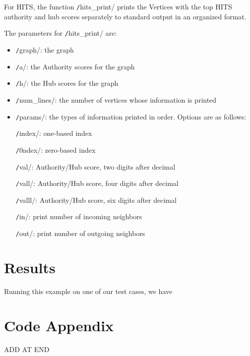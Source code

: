 \documentclass[12pt, titlepage, twoside]{amsart}
\begin{document}
For HITS, the function \texttt/hits_print/ prints
the Vertices with the top HITS authority and hub scores separately to standard output in
an organized format.

The parameters for \texttt/hits_print/ are:

\begin{itemize}[label={}]
\item \texttt/graph/: the graph

\item \texttt/a/: the Authority scores for the graph

\item \texttt/h/: the Hub scores for the graph

\item \texttt/num_lines/: the number of vertices whose information is printed

\item \texttt/params/: the types of information printed in order. Options are as follows:

\texttt/index/: one-based index

\texttt/0ndex/: zero-based index

\texttt/val/: Authority/Hub score, two digits after decimal

\texttt/vall/: Authority/Hub score, four digits after decimal

\texttt/valll/: Authority/Hub score, six digits after decimal

\texttt/in/: print number of incoming neighbors

\texttt/out/: print number of outgoing neighbors
\end{itemize}

\section{Results}

Running this example on one of our test cases, we have




\section{Code Appendix}

ADD AT END
\end{document}

